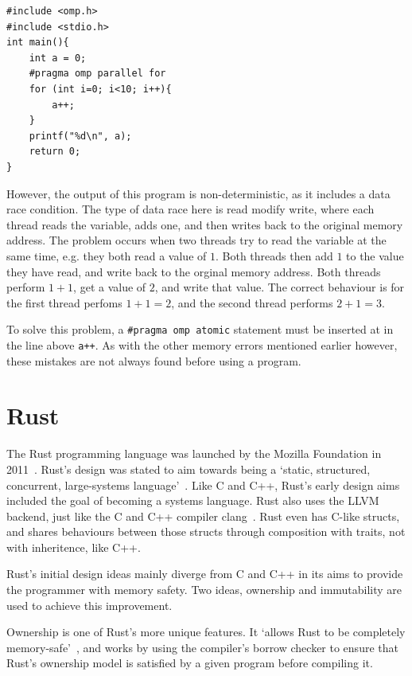 \begin{code}
\begin{verbatim}
#include <omp.h>
#include <stdio.h>
int main(){
    int a = 0;
    #pragma omp parallel for
    for (int i=0; i<10; i++){
        a++;
    }
    printf("%d\n", a);
    return 0;
}
\end{verbatim}
\label{lst:omp-eg}
\end{code}

However, the output of this program is non-deterministic, as it includes a data race condition. The type of data race here is read modify write, where each thread reads the variable, adds one, and then writes back to the original memory address.
The problem occurs when two threads try to read the variable at the same time, e.g. they both read a value of $1$. Both threads then add $1$ to the value they have read, and write back to the orginal memory address. 
Both threads perform $1+1$, get a value of $2$, and write that value. The correct behaviour is for the first thread perfoms $1+1=2$, and the second thread performs $2+1=3$.

To solve this problem, a \texttt{\#pragma omp atomic} statement must be inserted at in the line above \texttt{a++}. As with the other memory errors mentioned earlier however, these mistakes are not always found before using a program.

\section{Rust}\label{sec:rust}
The Rust programming language was launched by the Mozilla Foundation in 2011~\cite{FutureTense}. Rust's design was stated to aim towards being a `static, structured, concurrent, large-systems language'~\cite{pServo}. Like C and C++, Rust's early design aims included the goal of becoming a systems language.
Rust also uses the LLVM backend, just like the C and C++ compiler clang~\cite{rustClang}.
Rust even has C-like structs, and shares behaviours between those structs through composition with traits, not with inheritence, like C++.

Rust's initial design ideas mainly diverge from C and C++ in its aims to provide the programmer with memory safety. Two ideas, ownership and immutability are used to achieve this improvement. 

Ownership is one of Rust's more unique features. It `allows Rust to be completely memory-safe'~\cite{NomOwner}, and works by using the compiler's borrow checker to ensure that Rust's ownership model is satisfied by a given program before compiling it.

